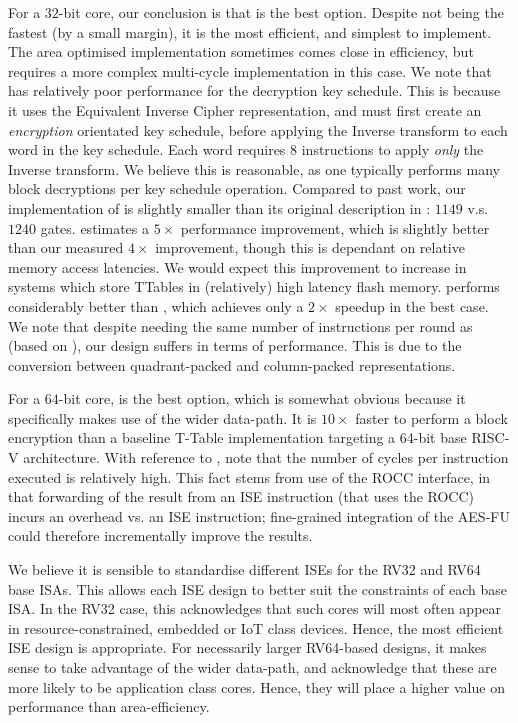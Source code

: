For a $32$-bit core, our conclusion is that
is the best option.
Despite not being the fastest (by a small margin), it is the most efficient,
and simplest to implement.
The area optimised  implementation sometimes comes close in
efficiency, but requires a more complex multi-cycle implementation
in this case.
We note that  has relatively poor performance for the decryption
key schedule.
This is because it uses the Equivalent Inverse Cipher representation,
and must first create an {\em encryption} orientated key schedule, before
applying the Inverse  transform to each word in the key schedule.
Each word requires $8$ instructions to apply {\em only} the Inverse  
transform. We believe this is reasonable, as one typically performs
many block decryptions per key schedule operation.
Compared to past work, our implementation of  is
slightly smaller than its original description in \cite{Saarinen:20}:
$1149$ v.s. $1240$ gates.
\cite{Saarinen:20} estimates a $5\times$ performance improvement, which is
slightly better than our measured $4\times$ improvement, though this is
dependant on relative memory access latencies.
We would expect this improvement to increase in systems which store TTables
in (relatively) high latency flash memory.
 performs considerably better than \cite{TilGroSze:05},
which achieves only a $2\times$ speedup in the best case.
We note that despite needing the same number of instructions per round
as  (based on \cite{TilGroSze:05}), our  design suffers in terms
of performance.
This is due to the conversion between quadrant-packed and column-packed
representations.

For a $64$-bit core,
is the best option, which is somewhat obvious because it specifically makes
use of the wider data-path.
It is $10\times$ faster to perform a block encryption than a baseline T-Table
implementation targeting a 64-bit base RISC-V architecture.
With reference to
, 
note that the number of cycles per instruction executed is relatively high.
This fact stems from use of the ROCC interface, in that forwarding of the 
result from an ISE instruction (that uses the ROCC) incurs an overhead vs. 
an ISE instruction; fine-grained integration of the AES-FU could therefore
incrementally improve the results.

We believe it is sensible to standardise different ISEs for the
RV32 and RV64 base ISAs.
This allows each ISE design to better suit the constraints of each
base ISA.
In the RV32 case, this acknowledges that such cores will most often
appear in resource-constrained, embedded or IoT class devices.
Hence, the most efficient ISE design is appropriate.
For necessarily larger RV64-based designs, it makes sense to take advantage
of the wider data-path, and acknowledge that these are more likely to
be application class cores. Hence, they will place a higher value
on performance than area-efficiency.

